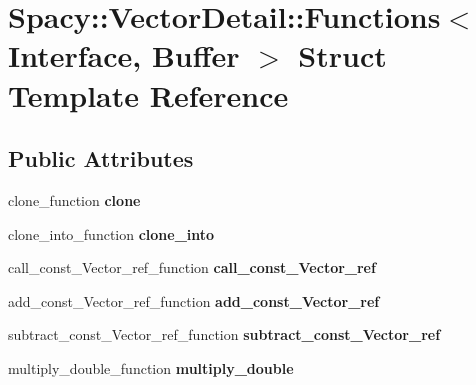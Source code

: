 \hypertarget{structSpacy_1_1VectorDetail_1_1Functions}{\section{\-Spacy\-:\-:\-Vector\-Detail\-:\-:\-Functions$<$ \-Interface, \-Buffer $>$ \-Struct \-Template \-Reference}
\label{structSpacy_1_1VectorDetail_1_1Functions}
}
\subsection*{\-Public \-Attributes}
\begin{DoxyCompactItemize}
\item 
\hypertarget{structSpacy_1_1VectorDetail_1_1Functions_a2448c389b840c3f9e1390d1846892605}{clone\-\_\-function {\bfseries clone}}\label{structSpacy_1_1VectorDetail_1_1Functions_a2448c389b840c3f9e1390d1846892605}

\item 
\hypertarget{structSpacy_1_1VectorDetail_1_1Functions_a35e5b47b74773ae937ae8ea579fb68e1}{clone\-\_\-into\-\_\-function {\bfseries clone\-\_\-into}}\label{structSpacy_1_1VectorDetail_1_1Functions_a35e5b47b74773ae937ae8ea579fb68e1}

\item 
\hypertarget{structSpacy_1_1VectorDetail_1_1Functions_a16455580163a452f66780d85b74e4cb2}{call\-\_\-const\-\_\-\-Vector\-\_\-ref\-\_\-function {\bfseries call\-\_\-const\-\_\-\-Vector\-\_\-ref}}\label{structSpacy_1_1VectorDetail_1_1Functions_a16455580163a452f66780d85b74e4cb2}

\item 
\hypertarget{structSpacy_1_1VectorDetail_1_1Functions_aa2eb879a1aebc1fe43d7197fe85b4acf}{add\-\_\-const\-\_\-\-Vector\-\_\-ref\-\_\-function {\bfseries add\-\_\-const\-\_\-\-Vector\-\_\-ref}}\label{structSpacy_1_1VectorDetail_1_1Functions_aa2eb879a1aebc1fe43d7197fe85b4acf}

\item 
\hypertarget{structSpacy_1_1VectorDetail_1_1Functions_a91f93c97f2a3e6a9784bfed014cb445c}{subtract\-\_\-const\-\_\-\-Vector\-\_\-ref\-\_\-function {\bfseries subtract\-\_\-const\-\_\-\-Vector\-\_\-ref}}\label{structSpacy_1_1VectorDetail_1_1Functions_a91f93c97f2a3e6a9784bfed014cb445c}

\item 
\hypertarget{structSpacy_1_1VectorDetail_1_1Functions_af1184404fb06f4ccc597a1e0e27006d8}{multiply\-\_\-double\-\_\-function {\bfseries multiply\-\_\-double}}\label{structSpacy_1_1VectorDetail_1_1Functions_af1184404fb06f4ccc597a1e0e27006d8}


\end{DoxyCompactItemize}
